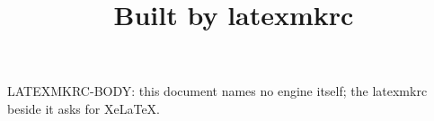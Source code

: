 \documentclass{article}
\title{Built by latexmkrc}
\begin{document}
\maketitle
LATEXMKRC-BODY: this document names no engine itself; the latexmkrc beside it asks for XeLaTeX.
\end{document}
